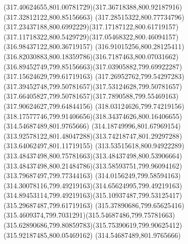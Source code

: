 {{	\curveto(317.40624655,801.00781729)(317.36718388,800.92187916)(317.32812122,800.85156663)
	\curveto(317.28515322,800.77734796)(317.23437188,800.6992229)(317.17187122,800.61719157)
	\curveto(317.11718322,800.5429729)(317.05468322,800.46094157)(316.98437122,800.36719157)
	\curveto(316.91015256,800.28125411)(316.82030883,800.18359786)(316.7187463,800.07031662)
	\curveto(316.89452749,799.85156663)(317.03905882,799.69922287)(317.15624629,799.61719163)
	\curveto(317.26952762,799.54297283)(317.39452748,799.50781657)(317.53124628,799.50781657)
	\curveto(317.66405827,799.50781657)(317.7890588,799.55469163)(317.90624627,799.64844156)
	\curveto(318.03124626,799.74219156)(318.17577746,799.91406656)(318.34374626,800.16406655)
	\closepath
	\moveto(314.54687489,801.9765666)
	\lineto(314.18749996,801.67969154)
	\curveto(313.92578122,801.48047288)(313.74218747,801.29297288)(313.64062497,801.11719155)
	\curveto(313.53515618,800.94922289)(313.48437498,800.75781663)(313.48437498,800.53906664)
	\curveto(313.48437498,800.21484786)(313.58593751,799.96094162)(313.79687497,799.77344163)
	\curveto(314.0156249,799.58594163)(314.30078116,799.49219163)(314.65624995,799.49219163)
	\curveto(314.89453114,799.49219163)(315.10937487,799.53125417)(315.29687487,799.61719163)
	\curveto(315.37890686,799.65625416)(315.4609374,799.7031291)(315.54687486,799.75781663)
	\curveto(315.62890686,799.80859783)(315.75390619,799.90625412)(315.92187485,800.05469162)
	\closepath
	\moveto(314.54687489,801.9765666)
}
}

